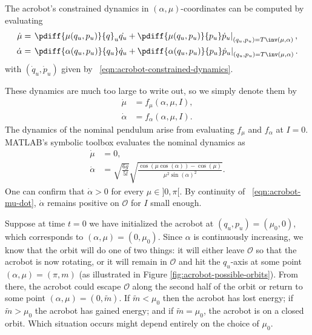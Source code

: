 The acrobot's constrained dynamics in
\((\alpha,\mu)\)-coordinates can be computed by evaluating
\begin{align*}
    \dot{\mu} &= \left.\pdiff{\mu(q_u,p_u)}{q}_u\dot{q_u} +
         \pdiff{\mu(q_u,p_u)}{p_u}\dot{p}_u
         \right|_{(q_u,p_u) = T\inv(\mu,\alpha)}
    , \\
    \dot{\alpha} &= \left.\pdiff{\alpha(q_u,p_u)}{q_u}\dot{q}_u + 
        \pdiff{\alpha(q_u,p_u)}{p_u}\dot{p}_u
        \right|_{(q_u,p_u) = T\inv(\mu,\alpha)}
    .
\end{align*}
with \((\dot{q}_u,\dot{p}_u)\) given by 
 ~\eqref{eqn:acrobot-constrained-dynamics}.

These dynamics are much too large to write out, so we simply denote them by
\begin{align}\label{eqn:acrobot-mu-dot}
    \dot{\mu} &= f_\mu(\alpha,\mu,I)
    ,\\
    \label{eqn:acrobot-alpha-dot}
    \dot{\alpha} &= f_\alpha(\alpha,\mu,I)
    .
\end{align}
The dynamics of the nominal pendulum arise from evaluating
\(f_\mu\) and \(f_\alpha\) at \(I = 0\).
MATLAB's symbolic toolbox evaluates the nominal dynamics as
\begin{align}\label{eqn:acrobot-mu-dot-nom}
    \dot{\mu} &= 0
    , \\
    \label{eqn:acrobot-alpha-dot-nom}
    \dot{\alpha} &= \sqrt{\frac{6g}{5l}} 
        \sqrt{\frac{\cos(\mu\cos(\alpha)) - \cos(\mu)}
            {\mu^2 \sin(\alpha)^2}}
    .
\end{align}
One can confirm that \(\dot{\alpha} > 0\) for every \(\mu \in ]0,\pi[\).
By continuity of ~\eqref{eqn:acrobot-mu-dot}, 
\(\dot{\alpha}\) remains positive on \(\mathcal{O}\) for \(I\) small enough.

Suppose at time \(t = 0\) we have initialized the acrobot at 
\((q_u,p_u) = (\mu_0,0)\), which corresponds to \((\alpha,\mu) = (0,\mu_0)\).
Since \(\alpha\) is continuously increasing, we know that the orbit will do one
of two things: it will either leave \(\mathcal{O}\) so that the acrobot is now rotating,
or it will remain in \(\mathcal{O}\) and hit the \(q_u\)-axis at some point 
\((\alpha,\mu) = (\pi,m)\) (as illustrated in Figure
\ref{fig:acrobot-possible-orbits}).
From there, the acrobot could escape \(\mathcal{O}\) along the second half of the orbit or
return to some point \((\alpha,\mu) = (0,\tilde{m})\).
If \(\tilde{m} < \mu_0\) then the acrobot has lost energy; 
if \(\tilde{m} > \mu_0\) the acrobot has gained energy; 
and if \(\tilde{m} = \mu_0\), the acrobot is on a closed orbit.
Which situation occurs might depend entirely on the choice of
\(\mu_0\).

